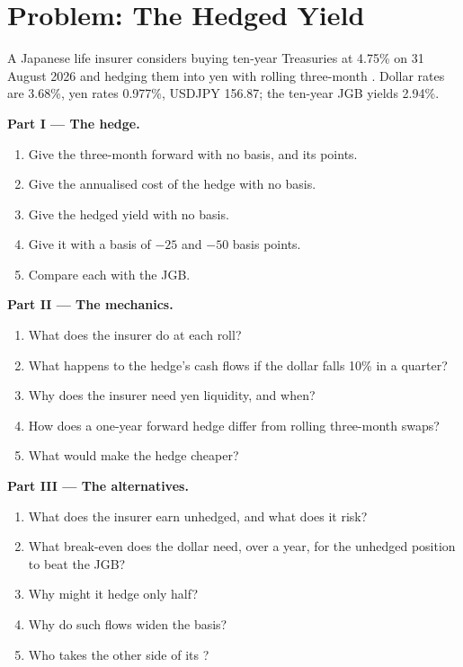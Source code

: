 \section{Problem: The Hedged Yield}

\begin{problem}\label{pb:m2:fx-swaps-forwards-and-the-cross-currency-basis:1}
A Japanese life insurer considers buying ten-year Treasuries at 4.75\% on 31
August 2026 and hedging them into yen with rolling three-month . Dollar
rates are 3.68\%, yen rates 0.977\%, USDJPY 156.87; the ten-year JGB yields 2.94\%.

\medskip\noindent\textbf{Part I --- The hedge.}
\begin{enumerate}
\item Give the three-month forward with no basis, and its points.
\item Give the annualised cost of the hedge with no basis.
\item Give the hedged yield with no basis.
\item Give it with a basis of $-25$ and $-50$ basis points.
\item Compare each with the JGB.
\end{enumerate}

\medskip\noindent\textbf{Part II --- The mechanics.}
\begin{enumerate}[resume]
\item What does the insurer do at each roll?
\item What happens to the hedge's cash flows if the dollar falls 10\% in a quarter?
\item Why does the insurer need yen liquidity, and when?
\item How does a one-year forward hedge differ from rolling three-month swaps?
\item What would make the hedge cheaper?
\end{enumerate}

\medskip\noindent\textbf{Part III --- The alternatives.}
\begin{enumerate}[resume]
\item What does the insurer earn unhedged, and what does it risk?
\item What break-even does the dollar need, over a year, for the unhedged position to beat the JGB?
\item Why might it hedge only half?
\item Why do such flows widen the basis?
\item Who takes the other side of its ?
\end{enumerate}


\end{problem}
